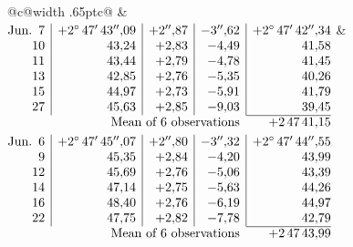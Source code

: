 \noindent\begin{tabular}{@{}c@{\hspace{.4em}\vrule width .65pt\hspace{.4em}}c@{}}
 &
 \\[.18ex]
\(\begin{array}[t]{@{}r|r|r|r|r@{}}
\text{Jun.}\enspace 7 & +2^\circ\,47'\,43''{,}09 & +2''{,}87 & -3''{,}62 & +2^\circ\,47'\,42''{,}34\\
10 & 43{,}24 & +2{,}83 & -4{,}49 & 41{,}58\\
11 & 43{,}44 & +2{,}79 & -4{,}78 & 41{,}45\\
13 & 42{,}85 & +2{,}76 & -5{,}35 & 40{,}26\\
15 & 44{,}97 & +2{,}73 & -5{,}91 & 41{,}79\\
27 & 45{,}63 & +2{,}85 & -9{,}03 & 39{,}45\\
\cline{5-5}
\multicolumn{4}{r}{\text{Mean of 6 observations}} & +2\,47\,41{,}15
\end{array}\)
&
\(\begin{array}[t]{@{}r|r|r|r|r@{}}
\text{Jun.}\enspace 6 & +2^\circ\,47'\,45''{,}07 & +2''{,}80 & -3''{,}32 & +2^\circ\,47'\,44''{,}55\\
9 & 45{,}35 & +2{,}84 & -4{,}20 & 43{,}99\\
12 & 45{,}69 & +2{,}76 & -5{,}06 & 43{,}39\\
14 & 47{,}14 & +2{,}75 & -5{,}63 & 44{,}26\\
16 & 48{,}40 & +2{,}76 & -6{,}19 & 44{,}97\\
22 & 47{,}75 & +2{,}82 & -7{,}78 & 42{,}79\\
\cline{5-5}
\multicolumn{4}{r}{\text{Mean of 6 observations}} & +2\,47\,43{,}99
\end{array}\)
\end{tabular}\par\medskip
{}
